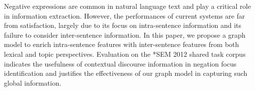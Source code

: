 Negative expressions are common in natural language text and play a critical role in information extraction. However, the performances of current systems are far from satisfaction, largely due to its focus on intra-sentence information and its failure to consider inter-sentence information. In this paper, we propose a graph model to enrich intra-sentence features with inter-sentence features from both lexical and topic perspectives. Evaluation on the *SEM 2012 shared task corpus indicates the usefulness of contextual discourse information in negation focus identification and justifies the effectiveness of our graph model in capturing such global information.
